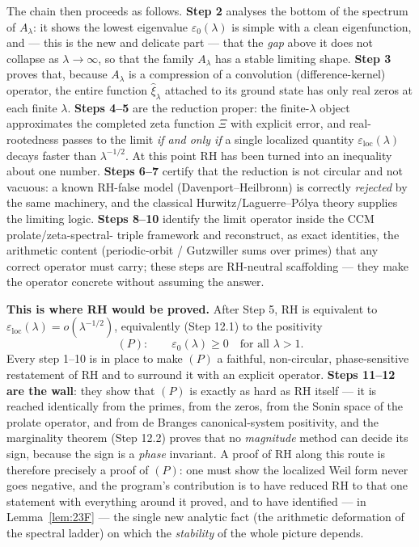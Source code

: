 \documentclass[11pt]{amsart}
\theoremstyle{definition}
\theoremstyle{remark}
\newcommand{\ve}{\varepsilon}
\newcommand{\loc}{\mathrm{loc}}
\begin{document}
The chain then proceeds as follows. \textbf{Step 2} analyses the bottom of the spectrum of
$A_\lambda$: it shows the lowest eigenvalue $\ve_0(\lambda)$ is simple with a clean
eigenfunction, and --- this is the new and delicate part --- that the \emph{gap} above it does
not collapse as $\lambda\to\infty$, so that the family $A_\lambda$ has a stable limiting shape.
\textbf{Step 3} proves that, because $A_\lambda$ is a compression of a convolution
(difference-kernel) operator, the entire function $\hat\xi_\lambda$ attached to its ground state
has only real zeros at each finite $\lambda$. \textbf{Steps 4--5} are the reduction proper: the
finite-$\lambda$ object approximates the completed zeta function $\Xi$ with explicit error, and
real-rootedness passes to the limit \emph{if and only if} a single localized quantity
$\ve_\loc(\lambda)$ decays faster than $\lambda^{-1/2}$. At this point RH has been turned into
an inequality about one number. \textbf{Steps 6--7} certify that the reduction is not circular
and not vacuous: a known RH-false model (Davenport--Heilbronn) is correctly \emph{rejected} by
the same machinery, and the classical Hurwitz/Laguerre--P\'olya theory supplies the limiting
logic. \textbf{Steps 8--10} identify the limit operator inside the CCM prolate/zeta-spectral-
triple framework and reconstruct, as exact identities, the arithmetic content (periodic-orbit /
Gutzwiller sums over primes) that any correct operator must carry; these steps are RH-neutral
scaffolding --- they make the operator concrete without assuming the answer.

\textbf{This is where RH would be proved.} After Step 5, RH is equivalent to
$\ve_\loc(\lambda)=o(\lambda^{-1/2})$, equivalently (Step 12.1) to the positivity
\[
(P):\qquad \ve_0(\lambda)\ge 0\quad\text{for all }\lambda>1 .
\]
Every step 1--10 is in place to make $(P)$ a faithful, non-circular, phase-sensitive
restatement of RH and to surround it with an explicit operator. \textbf{Steps 11--12 are the
wall}: they show that $(P)$ is exactly as hard as RH itself --- it is reached identically from
the primes, from the zeros, from the Sonin space of the prolate operator, and from de Branges
canonical-system positivity, and the marginality theorem (Step 12.2) proves that no
\emph{magnitude} method can decide its sign, because the sign is a \emph{phase} invariant. A
proof of RH along this route is therefore precisely a proof of $(P)$: one must show the
localized Weil form never goes negative, and the program's contribution is to have reduced RH
to that one statement with everything around it proved, and to have identified --- in
Lemma~\ref{lem:23F} --- the single new analytic fact (the arithmetic deformation of the
spectral ladder) on which the \emph{stability} of the whole picture depends.
\end{document}
